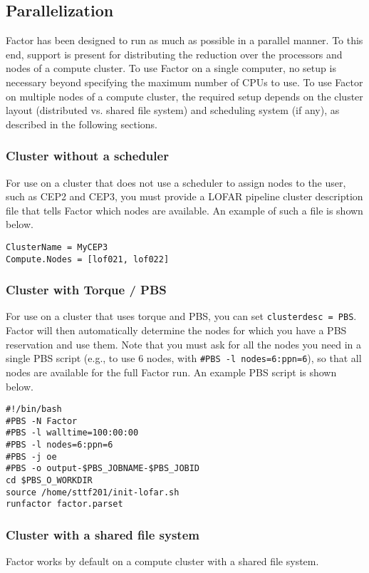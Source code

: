 \documentclass[structabstract]{article}
\begin{document}
\subsection{Parallelization}
\label{factor:parallel}

Factor has been designed to run as much as possible in a parallel manner. To
this end, support is present for distributing the reduction over the processors
and nodes of a compute cluster. To use Factor on a single computer, no setup is
necessary beyond specifying the maximum number of CPUs to use. To use Factor on
multiple nodes of a compute cluster, the required setup depends on the cluster
layout (distributed vs. shared file system) and scheduling system (if any), as
described in the following sections.

\subsubsection{Cluster without a scheduler}
For use on a cluster that does not use a scheduler to assign nodes to the user,
such as CEP2 and CEP3, you must provide a LOFAR pipeline cluster description
file that tells Factor which nodes are available. An example of such a file is
shown below.

\begin{verbatim}
ClusterName = MyCEP3
Compute.Nodes = [lof021, lof022]
\end{verbatim}

\subsubsection{Cluster with Torque / PBS }
For use on a cluster that uses torque and PBS, you can set {\tt clusterdesc =
PBS}. Factor will then automatically determine the nodes for which you have a
PBS reservation and use them. Note that you must ask for all the nodes you need
in a single PBS script (e.g., to use 6 nodes, with {\tt \#PBS -l
nodes=6:ppn=6}), so that all nodes are available for the full Factor run. An
example PBS script is shown below.

\begin{verbatim}
#!/bin/bash
#PBS -N Factor
#PBS -l walltime=100:00:00
#PBS -l nodes=6:ppn=6
#PBS -j oe
#PBS -o output-$PBS_JOBNAME-$PBS_JOBID
cd $PBS_O_WORKDIR
source /home/sttf201/init-lofar.sh
runfactor factor.parset
\end{verbatim}

\subsubsection{Cluster with a shared file system}
Factor works by default on a compute cluster with a shared file system.
\end{document}
